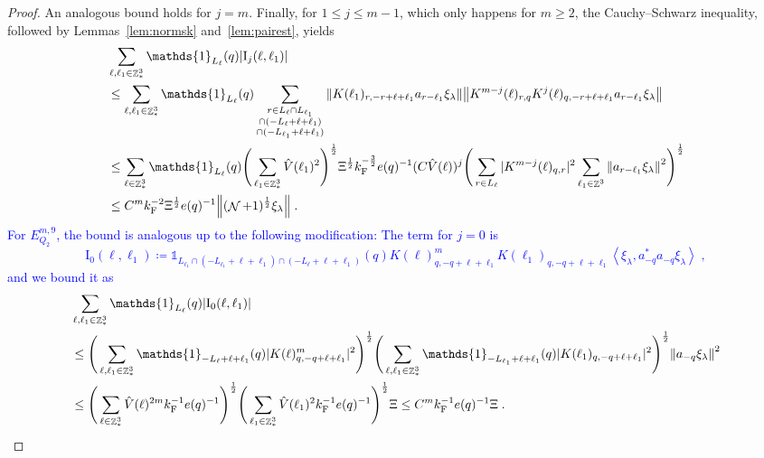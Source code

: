 \documentclass[12pt,a4paper]{article}
\numberwithin{equation}{section}
\newcommand{\1}{\mathbb{I}}
\newcommand{\F}{\mathrm{F}}
\newcommand{\I}{\mathrm{I}}
\DeclareMathOperator{\Z}{\mathbb{Z}}
\DeclareMathOperator{\NN}{\mathcal{N}}
\newcommand{\half}{\frac{1}{2}}
\newcommand{\eva}[1]{\left\langle #1 \right\rangle}
\theoremstyle{plain}
\theoremstyle{definition}
\theoremstyle{remark}
\theoremstyle{plain}
\theoremstyle{definition}
\theoremstyle{remark}
\begin{document}
\begin{proof}
{}
An analogous bound holds for $ j = m $. Finally, for $ 1 \le j \le m-1 $, which only happens for $ m \ge 2 $, the Cauchy--Schwarz inequality, followed by Lemmas~\ref{lem:normsk} and~\ref{lem:pairest}, yields
\textcolor{green!30!black}{
\begin{align}
	&\sum_{\ell,\ell_1 \in \Z^3_*} \mathds{1}_{L_\ell}(q) |\I_j(\ell, \ell_1)| \nonumber\\
	&\leq \sum_{\ell,\ell_1 \in \Z^3_*} \mathds{1}_{L_\ell}(q) \sum\limits_{\substack{r\in L_{\ell} \cap L_{\ell_1}\\\cap (-L_{\ell}+\ell+\ell_1) \\ \cap (-L_{\ell_1}+\ell+\ell_1)}} \norm{ K(\ell_1)_{r,-r+\ell+\ell_1} a_{r-\ell_1} \xi_\lambda} \norm{ K^{m-j}(\ell)_{r,q} K^j(\ell)_{q,-r+\ell+\ell_1} a_{r-\ell_1} \xi_\lambda} \nonumber\\
	&\leq \sum_{\ell \in \Z^3_*} \mathds{1}_{L_\ell}(q)
		\Bigg( \sum_{\ell_1 \in \Z^3_*} \hat{V}(\ell_1)^2 \Bigg)^{\half}
		\Xi^{\half} k_{\F}^{-\frac 32} e(q)^{-1} (C \hat{V}(\ell))^j
		\Bigg( \sum_{r \in L_{\ell}} |K^{m-j}(\ell)_{q,r}|^2 
		\sum_{\ell_1 \in \Z^3} \norm{a_{r-\ell_1} \xi_\lambda}^2 \Bigg)^{\half} \nonumber\\
	&\leq C^m k_{\F}^{-2} \Xi^{\half} e(q)^{-1} \norm{(\NN+1)^{\half} \xi_\lambda} \;. \label{eq:estEQ2182}
\end{align}
}
\textcolor{blue}{For $ E_{Q_2}^{m,9} $, the bound is analogous up to the following modification: The term for $ j = 0 $ is
\begin{equation}
	\I_0(\ell,\ell_1)
	\coloneq \mathds{1}_{L_{\ell_1} \cap (-L_{\ell_1} + \ell+\ell_1) \cap (-L_\ell + \ell+\ell_1)}(q)
		K(\ell)^m_{q,-q+\ell+\ell_1}
		K(\ell_1)_{q,-q+\ell+\ell_1}
		\eva{\xi_\lambda, a_{-q}^* a_{-q} \xi_\lambda} \;,
\end{equation}
and we bound it as
\begin{align}
	&\sum_{\ell,\ell_1 \in \Z^3_*} \mathds{1}_{L_\ell}(q) |\I_0(\ell,\ell_1)| \nonumber\\
	&\leq \Bigg( \sum_{\ell, \ell_1 \in \Z^3_*} \mathds{1}_{-L_\ell + \ell+\ell_1}(q) |K(\ell)^m_{q,-q+\ell+\ell_1}|^2 \Bigg)^{\half}
		\Bigg( \sum_{\ell, \ell_1 \in \Z^3_*} \mathds{1}_{-L_{\ell_1} + \ell+\ell_1}(q) |K(\ell_1)_{q,-q+\ell+\ell_1}|^2 \Bigg)^{\half}
	\norm{ a_{-q} \xi_\lambda }^2 \nonumber\\
	&\leq \Bigg( \sum_{\ell\in \Z^3_*} \hat{V}(\ell)^{2m} k_{\F}^{-1} e(q)^{-1} \Bigg)^{\half}
		\Bigg( \sum_{\ell_1 \in \Z^3_*} \hat{V}(\ell_1)^2 k_{\F}^{-1} e(q)^{-1} \Bigg)^{\half}
	\Xi
	\leq C^m
		k_{\F}^{-1} e(q)^{-1} \Xi \;.\label{eq:estEQ2181_bis}
\end{align}
}
\end{proof}
\end{document}
